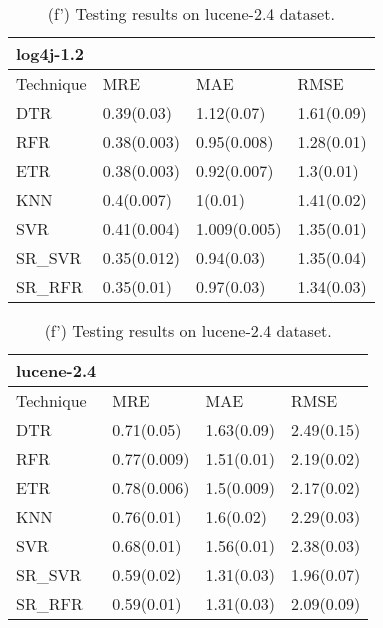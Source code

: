\documentclass[]{article}
\begin{document}
	\begin{table}[h]
		\captionsetup[subtable]{labelformat=empty}
		\begin{adjustwidth}{-2.9cm}{}
			\begin{subtable}{9cm}
				\centering
				\caption{(e') Testing results on log4j-1.2 dataset.}
				\label{tab:log4j-wv}
				\begin{tabular}{llll}
					\hline
					log4j-1.2 &&&\\ \hline
					Technique & MRE & MAE & RMSE\\  \hline
					DTR & 0.39(0.03) & 1.12(0.07) & 1.61(0.09)\\ 
					RFR & 0.38(0.003) & 0.95(0.008) & 1.28(0.01)\\ 
					ETR & 0.38(0.003) & 0.92(0.007) & 1.3(0.01)\\ 
					KNN & 0.4(0.007) & 1(0.01) & 1.41(0.02)\\ 
					SVR & 0.41(0.004) & 1.009(0.005) & 1.35(0.01)\\ 
					SR\_SVR & 0.35(0.012) & 0.94(0.03) & 1.35(0.04)\\
					SR\_RFR & 0.35(0.01) & 0.97(0.03) & 1.34(0.03)\\ \hline
				\end{tabular}
			\end{subtable}
			\begin{subtable}{9cm}
				\centering
				\caption{(f') Testing results on lucene-2.4 dataset.}
				\label{tab:lucene-wv}
				\begin{tabular}{llll}
					\hline
					lucene-2.4 &&&\\ \hline
					Technique & MRE & MAE & RMSE\\  \hline
					DTR & 0.71(0.05) & 1.63(0.09) & 2.49(0.15)\\ 
					RFR & 0.77(0.009) & 1.51(0.01) & 2.19(0.02)\\
					ETR & 0.78(0.006) & 1.5(0.009) & 2.17(0.02)\\ 
					KNN & 0.76(0.01) & 1.6(0.02) & 2.29(0.03)\\ 
					SVR & 0.68(0.01) & 1.56(0.01) & 2.38(0.03)\\ 
					SR\_SVR & 0.59(0.02) & 1.31(0.03) & 1.96(0.07)\\
					SR\_RFR & 0.59(0.01) & 1.31(0.03) & 2.09(0.09)\\ \hline
				\end{tabular}
			\end{subtable} 
		\end{adjustwidth}
	\end{table}
\end{document}
